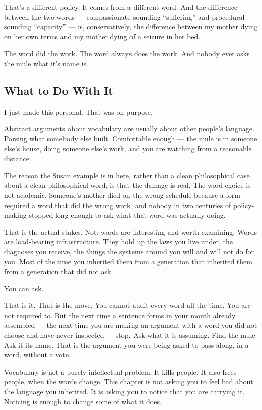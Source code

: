 \documentclass[11pt, letterpaper]{article}
\begin{document}
That's a different policy. It comes from a different word. And the difference between the two words --- compassionate-sounding ``suffering'' and procedural-sounding ``capacity'' --- is, conservatively, the difference between my mother dying on her own terms and my mother dying of a seizure in her bed.

The word did the work. The word always does the work. And nobody ever asks the mule what it's name is.

\subsection{What to Do With It}

I just made this personal. That was on purpose.

Abstract arguments about vocabulary are usually about other people's language. Parsing what somebody else built. Comfortable enough --- the mule is in someone else's house, doing someone else's work, and you are watching from a reasonable distance.

The reason the Susan example is in here, rather than a clean philosophical case about a clean philosophical word, is that the damage is real. The word choice is not academic. Someone's mother died on the wrong schedule because a form required a word that did the wrong work, and nobody in two centuries of policy-making stopped long enough to ask what that word was actually doing.

That is the actual stakes. Not: words are interesting and worth examining. Words are load-bearing infrastructure. They hold up the laws you live under, the diagnoses you receive, the things the systems around you will and will not do for you. Most of the time you inherited them from a generation that inherited them from a generation that did not ask.

You can ask.

That is it. That is the move. You cannot audit every word all the time. You are not required to. But the next time a sentence forms in your mouth already assembled --- the next time you are making an argument with a word you did not choose and have never inspected --- stop. Ask what it is assuming. Find the mule. Ask it its name. That is the argument you were being asked to pass along, in a word, without a vote.

Vocabulary is not a purely intellectual problem. It kills people. It also frees people, when the words change. This chapter is not asking you to feel bad about the language you inherited. It is asking you to notice that you are carrying it. Noticing is enough to change some of what it does.
\end{document}
